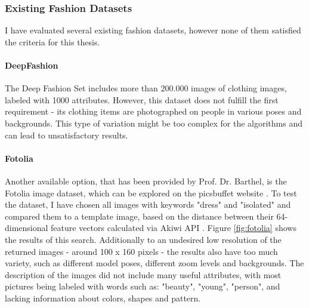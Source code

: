 \documentclass{article}
\begin{document}
\subsubsection{Existing Fashion Datasets}

I have evaluated several existing fashion datasets, however none of them satisfied the criteria for this thesis.

\paragraph{DeepFashion}
The Deep Fashion Set \cite{liu2016deepfashion} includes more than 200.000 images of clothing images, labeled with 1000 attributes. However, this dataset does not fulfill the first requirement - its clothing items are photographed on people in various poses and backgrounds. This type of variation might be too complex for the algorithms and can lead to unsatisfactory results.

\paragraph{Fotolia}
Another available option, that has been provided by Prof. Dr. Barthel, is the Fotolia image dataset, which can be explored on the picsbuffet website \cite{noauthor_picsbuffet_nodate}. To test the dataset, I have chosen all images with keywords "dress" and "isolated" and compared them to a template image, based on the distance between their 64-dimensional feature vectors calculated via Akiwi API \cite{sonnenberg_akiwi_nodate}. Figure \ref{fig:fotolia} shows the results of this search. Additionally to an undesired low resolution of the returned images - around 100 x 160 pixels - the results also have too much variety, such as different model poses, different zoom levels and backgrounds. The description of the images did not include many useful attributes, with most pictures being labeled with words such as: "beauty", "young", "person", and lacking information about colors, shapes and pattern.
\end{document}
